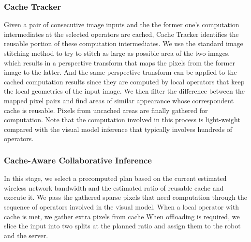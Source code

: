 \subsubsection{Cache Tracker}
Given a pair of consecutive image inputs and the the former one's computation intermediates at the selected operators are cached, Cache Tracker identifies the reusable portion of these computation intermediates.
We use the standard image stitching method to try to stitch as large as possible area of the two images, which results in a perspective transform that maps the pixels from the former image to the latter.
And the same perspective transform can be applied to the cached computation results since they are computed by local operators that keep the local geometries of the input image.
We then filter the difference between the mapped pixel pairs and find areas of similar appearance whose correspondent cache is reusable.
Pixels from uncached areas are finally gathered for computation.
Note that the computation involved in this process is light-weight compared with the visual model inference that typically involves hundreds of operators.

\subsubsection{Cache-Aware Collaborative Inference}
In this stage, we select a precomputed plan based on the current estimated wireless network bandwidth and the estimated ratio of reusable cache and execute it.
We pass the gathered sparse pixels that need computation through the sequence of operators involved in the visual model.
When a local operator with cache is met, we gather extra pixels from cache 
When offloading is required, we slice the input into two splits at the planned ratio and assign them to the robot and the server.

